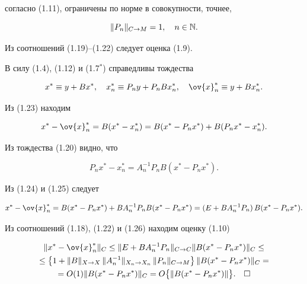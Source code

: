 согласно (1.11), ограничены по норме в совокупности, точнее,


\begin{equation}


\|P_n\|_{C\rightarrow M}=1,\quad n\in \bl{N}.


\end{equation}


Из соотношений (1.19)--(1.22) следует оценка (1.9).





В силу (1.4), (1.12) и (1.7$^*$) справедливы тождества


\begin{equation}


x^*\equiv y+Bx^*,\quad x_n^*\equiv P_ny+P_nBx_n^*,\quad


\ov{x}_n^*\equiv y+Bx_n^*.


\end{equation}


Из (1.23) находим


\begin{equation}


x^*-\ov{x}_n^*=B(x^*-x_n^*)=B(x^*-P_nx^*)+B(P_nx^*-x_n^*).


\end{equation}


Из тождества (1.20) видно, что


\begin{equation}


P_nx^*-x_n^*=A_n^{-1}P_nB(x^*-P_nx^*).


\end{equation}


Из (1.24) и (1.25) следует


\begin{equation}


x^*-\ov{x}_n^*=B(x^*-P_nx^*)+BA_n^{-1}P_nB(x^*-P_nx^*)=


(E+BA_n^{-1}P_n)\, B(x^*-P_nx^*).


\end{equation}


Из соотношений (1.18), (1.22) и (1.26) находим оценку (1.10)


\begin{multline*}


\|x^*-\ov{x}_n^*\|_C\leq \|E+BA_n^{-1}P_n\|_{C\rightarrow C}


\|B(x^*-P_nx^*)\|_C\leq \\


%


\leq \bigl\{ 1+\|B\|_{X\rightarrow X}\, \|A_n^{-1}\|_{X_n\rightarrow X_n}\,


\|P_n\|_{C\rightarrow M}\bigr\}\, \|B(x^*-P_nx^*)\|_C= \\


%


=O(1) \|B(x^*-P_nx^*)\|_C=O\bigl\{ \|B(x^*-P_nx^*)\|\bigr\}.\quad\square


\end{multline*}






